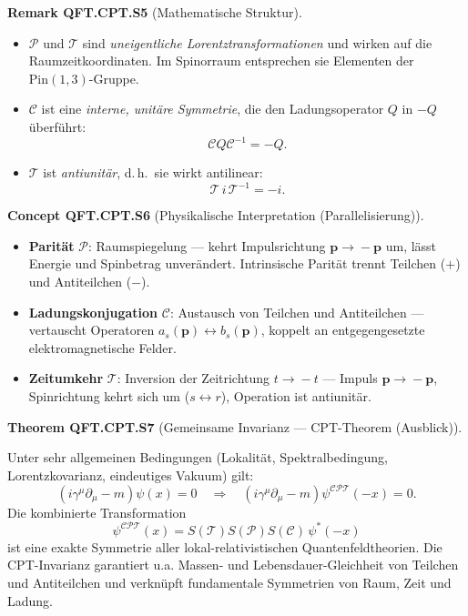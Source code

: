 \documentclass[10pt, letterpaper]{article}
\newcommand{\Pin}{\mathrm{Pin}}
\newcommand{\CustomHeading}[3]{%
  \par\medskip\noindent%
  \textbf{#1 #2} \textnormal{(#3)}.\enskip%
}
\newenvironment{THEO}[2]{\begin{unitbox}\CustomHeading{Theorem}{#1}{#2}}{\end{unitbox}}
\newenvironment{REM}[2]{\begin{unitbox}\CustomHeading{Remark}{#1}{#2}}{\end{unitbox}}
\newenvironment{CONC}[2]{\begin{unitbox}\CustomHeading{Concept}{#1}{#2}}{\end{unitbox}}
\begin{document}
\begin{REM}{QFT.CPT.S5}{Mathematische Struktur}
\begin{itemize}
  \item $\mathcal P$ und $\mathcal T$ sind \emph{uneigentliche Lorentztransformationen} und wirken auf die Raumzeitkoordinaten.  
  Im Spinorraum entsprechen sie Elementen der $\Pin(1,3)$-Gruppe.
  \item $\mathcal C$ ist eine \emph{interne, unitäre Symmetrie}, die den Ladungsoperator $Q$ in $-Q$ überführt:
  \[
  \mathcal C Q \mathcal C^{-1} = -Q.
  \]
  \item $\mathcal T$ ist \emph{antiunitär}, d.\,h.\ sie wirkt antilinear:
  \[
  \mathcal T\,i\,\mathcal T^{-1}=-i.
  \]
\end{itemize}
\end{REM}

\begin{CONC}{QFT.CPT.S6}{Physikalische Interpretation (Parallelisierung)}
\begin{itemize}
  \item \textbf{Parität} $\mathcal P$: Raumspiegelung — kehrt Impulsrichtung $\mathbf p\!\to\!-\mathbf p$ um, lässt Energie und Spinbetrag unverändert.  
    Intrinsische Parität trennt Teilchen ($+$) und Antiteilchen ($-$).
  \item \textbf{Ladungskonjugation} $\mathcal C$: Austausch von Teilchen und Antiteilchen — vertauscht Operatoren $a_s(\mathbf p)\leftrightarrow b_s(\mathbf p)$, koppelt an entgegengesetzte elektromagnetische Felder.
  \item \textbf{Zeitumkehr} $\mathcal T$: Inversion der Zeitrichtung $t\!\to\!-t$ — Impuls $\mathbf p\!\to\!-\mathbf p$, Spinrichtung kehrt sich um ($s\leftrightarrow r$), Operation ist antiunitär.
\end{itemize}
\end{CONC}

\begin{THEO}{QFT.CPT.S7}{Gemeinsame Invarianz — CPT-Theorem (Ausblick)}
Unter sehr allgemeinen Bedingungen (Lokalität, Spektralbedingung, Lorentzkovarianz, eindeutiges Vakuum) gilt:
\[
\boxed{(i\gamma^\mu\partial_\mu - m)\psi(x)=0
\quad\Longrightarrow\quad
(i\gamma^\mu\partial_\mu - m)\psi^{\mathcal{CPT}}(-x)=0.}
\]
Die kombinierte Transformation
\[
\psi^{\mathcal{CPT}}(x)
= S(\mathcal T)S(\mathcal P)S(\mathcal C)\,\psi^*(-x)
\]
ist eine exakte Symmetrie aller lokal-relativistischen Quantenfeldtheorien.  
Die CPT-Invarianz garantiert u.a. Massen- und Lebensdauer-Gleichheit von Teilchen und Antiteilchen und verknüpft fundamentale Symmetrien von Raum, Zeit und Ladung.
\end{THEO}
\end{document}
